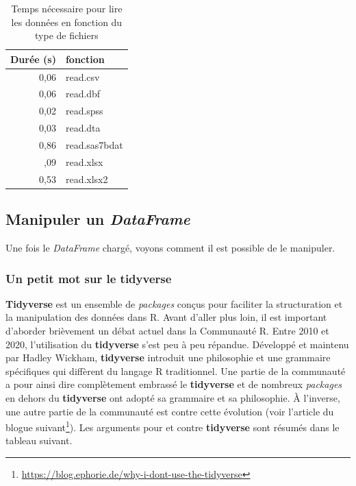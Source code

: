 \documentclass[
  11pt,
  french,
]{book}
\renewcommand{\href}[2]{#2\footnote{\url{#1}}}
\begin{document}
\begin{table}

\caption{\label{tab:tableduration}Temps nécessaire pour lire les données en fonction du type de fichiers}
\centering
\fontsize{8}{10}\selectfont
\begin{tabular}[t]{rl}
\toprule
Durée (s) & fonction\\
\midrule
0,06 & read.csv\\
0,06 & read.dbf\\
0,02 & read.spss\\
0,03 & read.dta\\
0,86 & read.sas7bdat\\
\addlinespace
20,09 & read.xlsx\\
0,53 & read.xlsx2\\
\bottomrule
\end{tabular}
\end{table}

\hypertarget{sect0142}{%
\subsection{\texorpdfstring{Manipuler un \emph{DataFrame}}{Manipuler un DataFrame}}\label{sect0142}}

Une fois le \emph{DataFrame} chargé, voyons comment il est possible de le manipuler.

\hypertarget{sect01421}{%
\subsubsection{\texorpdfstring{Un petit mot sur le \textbf{tidyverse}}{Un petit mot sur le tidyverse}}\label{sect01421}}

\textbf{Tidyverse} est un ensemble de \emph{packages} conçus pour faciliter la structuration et la manipulation des données dans R. Avant d'aller plus loin, il est important d'aborder brièvement un débat actuel dans la Communauté R. Entre 2010 et 2020, l'utilisation du \textbf{tidyverse} s'est peu à peu répandue. Développé et maintenu par Hadley Wickham, \textbf{tidyverse} introduit une philosophie et une grammaire spécifiques qui diffèrent du langage R traditionnel. Une partie de la communauté a pour ainsi dire complètement embrassé le \textbf{tidyverse} et de nombreux \emph{packages} en dehors du \textbf{tidyverse} ont adopté sa grammaire et sa philosophie. À l'inverse, une autre partie de la communauté est contre cette évolution (\href{https://blog.ephorie.de/why-i-dont-use-the-tidyverse}{voir l'article du blogue suivant}). Les arguments pour et contre \textbf{tidyverse} sont résumés dans le tableau suivant.
\end{document}
